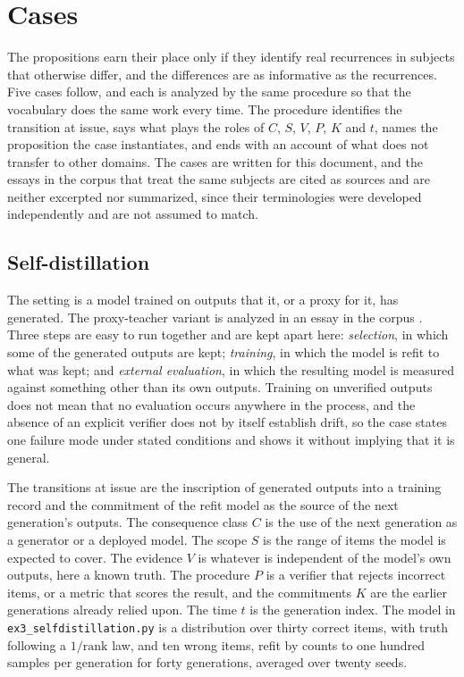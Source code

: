 \section{Cases}

The propositions earn their place only if they identify real recurrences in subjects that otherwise differ, and the differences are as informative as the recurrences. Five cases follow, and each is analyzed by the same procedure so that the vocabulary does the same work every time. The procedure identifies the transition at issue, says what plays the roles of $C$, $S$, $V$, $P$, $K$ and $t$, names the proposition the case instantiates, and ends with an account of what does not transfer to other domains. The cases are written for this document, and the essays in the corpus that treat the same subjects are cited as sources and are neither excerpted nor summarized, since their terminologies were developed independently and are not assumed to match.

\subsection{Self-distillation}

The setting is a model trained on outputs that it, or a proxy for it, has generated. The proxy-teacher variant is analyzed in an essay in the corpus \cite{contrast}. Three steps are easy to run together and are kept apart here: \emph{selection}, in which some of the generated outputs are kept; \emph{training}, in which the model is refit to what was kept; and \emph{external evaluation}, in which the resulting model is measured against something other than its own outputs. Training on unverified outputs does not mean that no evaluation occurs anywhere in the process, and the absence of an explicit verifier does not by itself establish drift, so the case states one failure mode under stated conditions and shows it without implying that it is general.

The transitions at issue are the inscription of generated outputs into a training record and the commitment of the refit model as the source of the next generation's outputs. The consequence class $C$ is the use of the next generation as a generator or a deployed model. The scope $S$ is the range of items the model is expected to cover. The evidence $V$ is whatever is independent of the model's own outputs, here a known truth. The procedure $P$ is a verifier that rejects incorrect items, or a metric that scores the result, and the commitments $K$ are the earlier generations already relied upon. The time $t$ is the generation index. The model in \texttt{ex3\_selfdistillation.py} is a distribution over thirty correct items, with truth following a $1/\text{rank}$ law, and ten wrong items, refit by counts to one hundred samples per generation for forty generations, averaged over twenty seeds.

